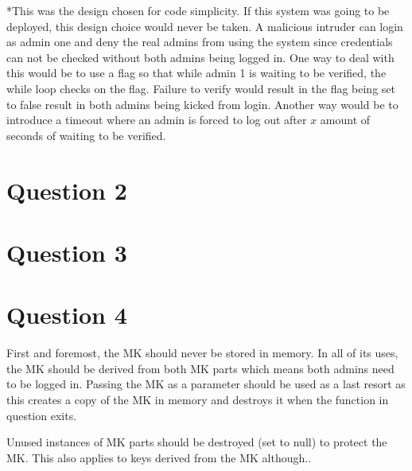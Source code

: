 \documentclass[a4paper, 12pt]{article}
\begin{document}
*This was the design chosen for code simplicity. If this system was going to be deployed, this design choice would never be taken. A malicious intruder can login as admin one and deny the real admins from using the system since credentials can not be checked without both admins being logged in.
One way to deal with this would be to use a flag so that while admin 1 is waiting to be verified, the while loop checks on the flag. Failure to verify would result in the flag being set to false result in both admins being kicked from login. Another way would be to introduce a timeout where an admin is forced to log out after $x$ amount of seconds of waiting to be verified.



\section{Question 2}
\section{Question 3}
\section{Question 4}
First and foremost, the MK should never be stored in memory. In all of its uses, the MK should be derived from both MK parts which means both admins need to be logged in. Passing the MK as a parameter should be used as a last resort as this creates a copy of the MK in memory and destroys it when the function in question exits.
\par
Unused instances of MK parts should be destroyed (set to null) to protect the MK. This also applies to keys derived from the MK although..


 
\end{document}
